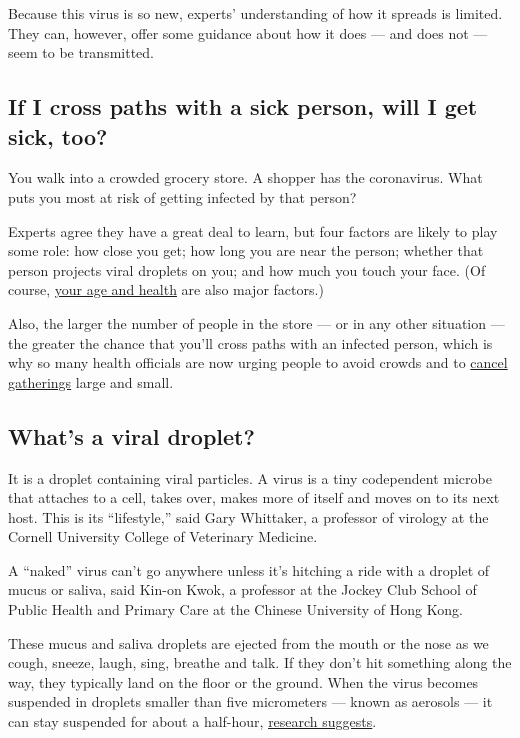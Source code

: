 Because this virus is so new, experts' understanding of how it spreads
is limited. They can, however, offer some guidance about how it does ---
and does not --- seem to be transmitted.

\hypertarget{if-i-cross-paths-with-a-sick-person-will-i-get-sick-too}{%
\subsection{If I cross paths with a sick person, will I get sick,
too?}\label{if-i-cross-paths-with-a-sick-person-will-i-get-sick-too}}

You walk into a crowded grocery store. A shopper has the coronavirus.
What puts you most at risk of getting infected by that person?

Experts agree they have a great deal to learn, but four factors are
likely to play some role: how close you get; how long you are near the
person; whether that person projects viral droplets on you; and how much
you touch your face. (Of course,
\href{https://www.nytimes3xbfgragh.onion/2020/02/20/health/coronavirus-men-women.html}{your
age and health} are also major factors.)

Also, the larger the number of people in the store --- or in any other
situation --- the greater the chance that you'll cross paths with an
infected person, which is why so many health officials are now urging
people to avoid crowds and to
\href{https://www.cdc.gov/coronavirus/2019-ncov/community/large-events/mass-gatherings-ready-for-covid-19.html}{cancel
gatherings} large and small.

\hypertarget{whats-a-viral-droplet}{%
\subsection{What's a viral droplet?}\label{whats-a-viral-droplet}}

It is a droplet containing viral particles. A virus is a tiny
codependent microbe that attaches to a cell, takes over, makes more of
itself and moves on to its next host. This is its ``lifestyle,'' said
Gary Whittaker, a professor of virology at the Cornell University
College of Veterinary Medicine.

A ``naked'' virus can't go anywhere unless it's hitching a ride with a
droplet of mucus or saliva, said Kin-on Kwok, a professor at the Jockey
Club School of Public Health and Primary Care at the Chinese University
of Hong Kong.

These mucus and saliva droplets are ejected from the mouth or the nose
as we cough, sneeze, laugh, sing, breathe and talk. If they don't hit
something along the way, they typically land on the floor or the ground.
When the virus becomes suspended in droplets smaller than five
micrometers --- known as aerosols --- it can stay suspended for about a
half-hour,
\href{https://www.nytimes3xbfgragh.onion/2020/03/17/health/coronavirus-surfaces-aerosols.html}{research
suggests}.

